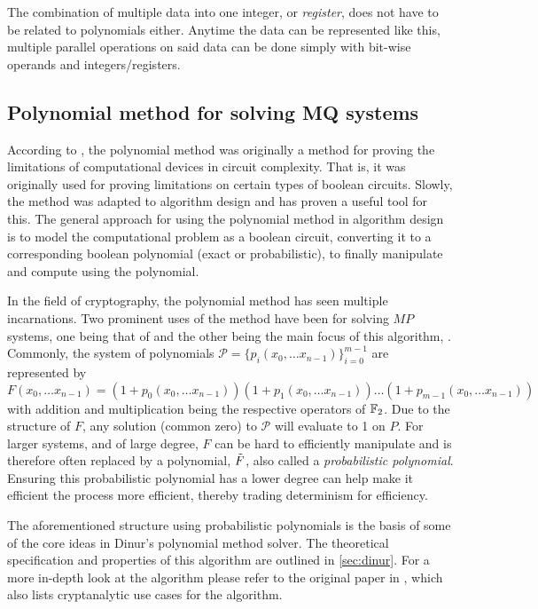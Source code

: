 The combination of multiple data into one integer, or \textit{register}, does not have to be related to polynomials either. Anytime the data can be represented like this, multiple parallel operations on said data can be done simply with bit-wise operands and integers/registers.

\subsection{Polynomial method for solving MQ systems} \label{sec:prereq:polymethod}
According to \cite{Williams2014ThePM}, the polynomial method was originally a method for proving the limitations of computational devices in circuit complexity. That is, it was originally used for proving limitations on certain types of boolean circuits. Slowly, the method was adapted to algorithm design and has proven a useful tool for this. The general approach for using the polynomial method in algorithm design is to model the computational problem as a boolean circuit, converting it to a corresponding boolean polynomial (exact or probabilistic), to finally manipulate and compute using the polynomial. 

In the field of cryptography, the polynomial method has seen multiple incarnations. Two prominent uses of the method have been for solving $MP$ systems, one being that of \cite{doi:10.1137/1.9781611974782.143} and the other being the main focus of this algorithm, \cite{eurocrypt-2021-30841}. Commonly, the system of polynomials $\mathcal{P} = \{p_i(x_0, \dots x_{n - 1})\}_{i = 0}^{m - 1}$ are represented by 
$$
    F(x_0, \dots x_{n - 1}) = (1 + p_0(x_0, \dots x_{n - 1}))(1 + p_1(x_0, \dots x_{n - 1})) \dots (1 + p_{m - 1}(x_0, \dots x_{n - 1}))
$$
with addition and multiplication being the respective operators of $\mathbb{F}_2$. Due to the structure of $F$, any solution (common zero) to $\mathcal{P}$ will evaluate to 1 on $P$. For larger systems, and of large degree, $F$ can be hard to efficiently manipulate and is therefore often replaced by a polynomial, $\Tilde{F}$, also called a \textit{probabilistic polynomial}. Ensuring this probabilistic polynomial has a lower degree can help make it efficient the process more efficient, thereby trading determinism for efficiency.

The aforementioned structure using probabilistic polynomials is the basis of some of the core ideas in Dinur's polynomial method solver. The theoretical specification and properties of this algorithm are outlined in \cref{sec:dinur}. For a more in-depth look at the algorithm please refer to the original paper in \cite{eurocrypt-2021-30841}, which also lists cryptanalytic use cases for the algorithm.

